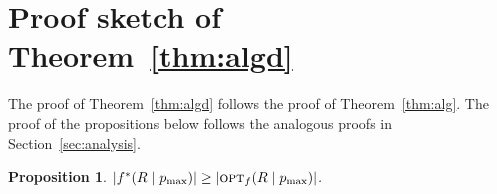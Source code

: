 \documentclass[11pt]{article}
\newtheorem{proposition}[theorem]{Proposition}
\newcommand{\opt}{\text{\textsc{opt}}}
\newcommand{\pmax}{p_{\max}}
\newenvironment{proof sketch}[1]{\noindent {\emph{Proof sketch of #1:}}}{\hfill \qed}
\begin{document}
\begin{comment}
\section{Partial Tiles for $d=2$}\label{appendix:partial}

In this appendix we discuss partial tiles for the case of $d=2$.
In this case the standard drawing of the space-time graph $G^{st}$ is $3$-dimensional, thus tiles are cubes.


A cube in the untilted space-time graph is \emph{partial} if it intersects the plane $t=0$.
When $d=2$ there are $3$ types of partial cubes as depicted in Figure~\ref{fig:hard-caps}. Note that when $d=1$ there is only one type of partial cubes.

We now show that partial cubes do not pose a problem to detailed routing. Every detailed path that traverses a cube of Type-$0$ must originate from that cube.
Every path that traverses cube of Type-$0$ and Type-$1$, has the property that from each entry point the cube seems to be complete. Namely, all reachable nodes exist.

Note that, if a detailed path traverses partial cubes, it traverses them from Type-$0$ to Type-$1$, from Type-$1$ to Type-$2$, and from Type-$2$ to a ``full'' cube.
\begin{figure}[h!]
     \centering
     \texttt{[image: hard-caps3.eps]}
     \caption{ Three types of partial cubes that intersect with the boundary of
       $V^{st}$ after untilting. The hatched plane corresponds to vertices with $t=0$ before untilting. Note that a partial tile consists of the vertices that are above the hatched plane. }
     \label{fig:hard-caps}
\end{figure}
\end{comment}

\section{Proof sketch of Theorem~\ref{thm:algd}}\label{sec:proofdd}

The proof of Theorem~\ref{thm:algd} follows the proof of Theorem~\ref{thm:alg}.
The proof of the propositions below follows the analogous proofs in Section~\ref{sec:analysis}.

\begin{proposition}\label{prop:optd}
    $|f^*(R \mid \pmax)| \geq |\opt_f(R \mid \pmax)|$.
\end{proposition}
\end{document}
